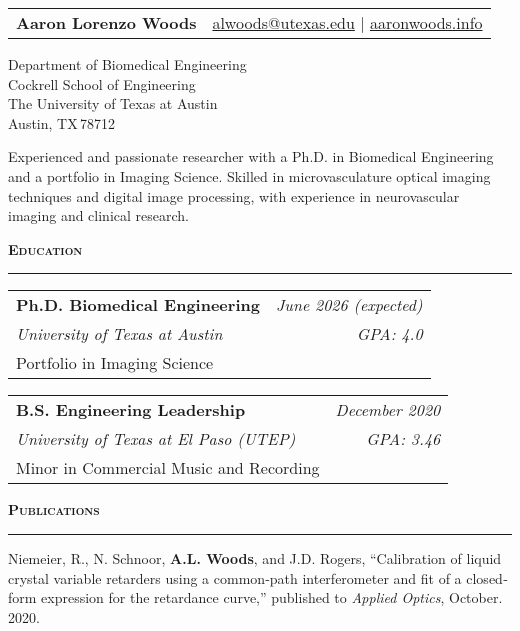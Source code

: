 \documentclass[11pt]{article}
\newcommand{\sectionheading}[1]{%
  \vspace{1.2ex}%
  {\large\bfseries\textsc{#1}}\par\vspace{0.4ex}%
  \color{gray}\rule{\linewidth}{0.5pt}\color{black}\vspace{0.6ex}%
}
\begin{document}
\noindent\begin{tabularx}{\textwidth}{@{}Y r@{}}
  {\Large\bfseries Aaron Lorenzo Woods} & \href{mailto:alwoods@utexas.edu}{alwoods@utexas.edu} \;|\; \href{https://aaronwoods.info}{aaronwoods.info} \\
\end{tabularx}
\vspace{0.6ex}
\noindent Department of Biomedical Engineering\\
\noindent Cockrell School of Engineering\\
\noindent The University of Texas at Austin\\
\noindent Austin, TX\,78712

\vspace{1ex}

Experienced and passionate researcher with a Ph.D. in Biomedical Engineering and a portfolio in Imaging Science. Skilled in microvasculature optical imaging techniques and digital image processing, with experience in neurovascular imaging and clinical research.

\sectionheading{Education}

\begin{tabularx}{\textwidth}{@{}Y r@{}}
  \textbf{Ph.D. Biomedical Engineering} & \textit{June 2026 (expected)}\\
  \emph{University of Texas at Austin} & \textit{GPA: 4.0}\\
  Portfolio in Imaging Science & \\
\end{tabularx}

\vspace{0.8ex}

\begin{tabularx}{\textwidth}{@{}Y r@{}}
  \textbf{B.S. Engineering Leadership} & \textit{December 2020}\\
  \emph{University of Texas at El Paso (UTEP)} & \textit{GPA: 3.46}\\
  Minor in Commercial Music and Recording & \\
\end{tabularx}

\sectionheading{Publications}

{\small
Niemeier, R., N. Schnoor, \textbf{A.L. Woods}, and J.D. Rogers, ``Calibration of liquid crystal variable retarders using a common‐path interferometer and fit of a closed‐form expression for the retardance curve,'' published to \textit{Applied Optics}, October.\,2020.
}
\end{document}
